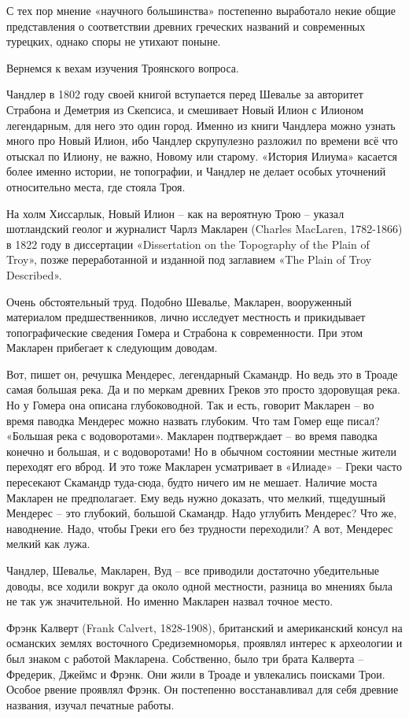 С тех пор мнение «научного большинства» постепенно выработало некие общие представления о соответствии древних греческих названий и современных турецких, однако споры не утихают поныне.

Вернемся к вехам изучения Троянского вопроса.

Чандлер в 1802 году своей книгой вступается перед Шевалье за авторитет Страбона и Деметрия из Скепсиса, и смешивает Новый Илион с Илионом легендарным, для него это один город. Именно из книги Чандлера можно узнать много про Новый Илион, ибо Чандлер скрупулезно разложил по времени всё что отыскал по Илиону, не важно, Новому или старому. «История Илиума» касается более именно истории, не топографии, и Чандлер не делает особых уточнений относительно места, где стояла Троя.

На холм Хиссарлык, Новый Илион – как на вероятную Трою – указал шотландский геолог и журналист Чарлз Макларен (Charles MacLaren, 1782-1866) в 1822 году в диссертации «Dissertation on the Topography of the Plain of Troy», позже переработанной и изданной под заглавием «The Plain of Troy Described».

Очень обстоятельный труд. Подобно Шевалье, Макларен, вооруженный материалом предшественников, лично исследует местность и прикидывает топографические сведения Гомера и Страбона к современности. При этом Макларен прибегает к следующим доводам. 

Вот, пишет он, речушка Мендерес, легендарный Скамандр. Но ведь это в Троаде самая большая река. Да и по меркам древних Греков это просто здоровущая река. Но у Гомера она описана глубоководной. Так и есть, говорит Макларен – во время паводка Мендерес можно назвать глубоким. Что там Гомер еще писал? «Большая река с водоворотами». Макларен подтверждает – во время паводка конечно и большая, и с водоворотами! Но в обычном состоянии местные жители переходят его вброд. И это тоже Макларен усматривает в «Илиаде» – Греки часто пересекают Скамандр туда-сюда, будто ничего им не мешает. Наличие моста Макларен не предполагает. Ему ведь нужно доказать, что мелкий, тщедушный Мендерес – это глубокий, большой Скамандр. Надо углубить Мендерес? Что же, наводнение. Надо, чтобы Греки его без трудности переходили? А вот, Мендерес мелкий как лужа.

Чандлер, Шевалье, Макларен, Вуд – все приводили достаточно убедительные доводы, все ходили вокруг да около одной местности, разница во мнениях была не так уж значительной. Но именно Макларен назвал точное место.

Фрэнк Калверт (Frank Calvert, 1828-1908), британский и американский консул на османских землях восточного Средиземноморья, проявлял интерес к археологии и был знаком с работой Макларена. Собственно, было три брата Калверта – Фредерик, Джеймс и Фрэнк. Они жили в Троаде и увлекались поисками Трои. Особое рвение проявлял Фрэнк. Он постепенно восстанавливал для себя древние названия, изучал печатные работы.

